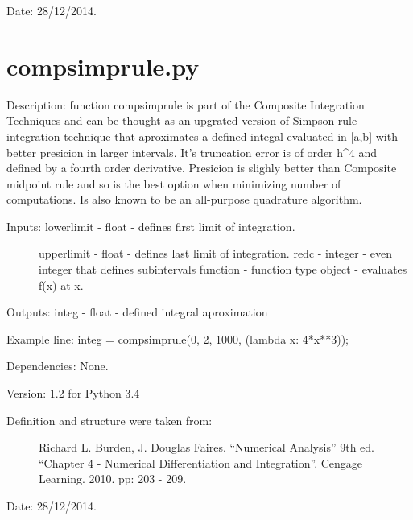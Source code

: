 \documentclass[letterpaper,10pt,oneside]{sphinxmanual}
\theoremstyle{plain}%
\theoremstyle{definition}%
\theoremstyle{remark}%
\begin{document}
Date: 28/12/2014.


\section{compsimprule.py}
\label{code:compsimprule-py}\label{code:module-compsimprule}
Description: function compsimprule is part of the Composite Integration
Techniques and can be thought as an upgrated version of Simpson rule
integration technique that aproximates a defined integal evaluated in {[}a,b{]}
with better presicion in larger intervals. It's truncation error is of order
h\textasciicircum{}4 and defined by a fourth order derivative. Presicion is slighly better
than Composite midpoint rule and so is the best option when minimizing
number of computations. Is also known to be an all-purpose quadrature algorithm.
\begin{description}
\item[{Inputs: lowerlimit - float - defines first limit of integration.}] \leavevmode
upperlimit - float - defines last limit of integration.
redc - integer - even integer that defines subintervals
function - function type object - evaluates f(x) at x.

\end{description}

Outputs: integ - float - defined integral aproximation

Example line: integ = compsimprule(0, 2, 1000, (lambda x: 4*x**3));

Dependencies: None.

Version: 1.2 for Python 3.4
\begin{description}
\item[{Definition and structure were taken from:}] \leavevmode
Richard L. Burden, J. Douglas Faires. ``Numerical Analysis'' 9th ed.
``Chapter 4 - Numerical Differentiation and Integration''. 
Cengage Learning. 2010. pp: 203 - 209.

\end{description}


Date: 28/12/2014.
\end{document}
